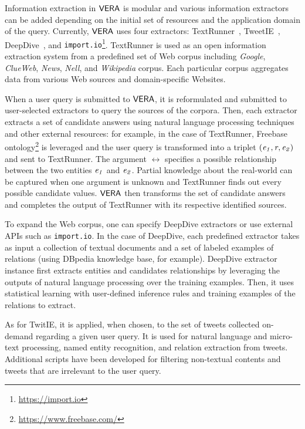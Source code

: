Information extraction in $\mathsf{VERA}$ is modular and  various information extractors can be added depending on the initial set of resources  and the application domain of the query. Currently, $\mathsf{VERA}$ uses four extractors: TextRunner~\cite{Yates07}, TweetIE~\cite{twitie}, DeepDive~\cite{Zha15}, and {\small\texttt{import.io}}\footnote{\scriptsize{\url{https://import.io}}}. TextRunner is  used as an open information extraction system from a predefined set of Web corpus including \emph{Google}, \emph{ClueWeb}, \emph{News}, \emph{Nell}, and 
\emph{Wikipedia} corpus. Each particular corpus aggregates data from various  
 Web sources and domain-specific Websites.

When a user query is submitted to $\mathsf{VERA}$, it is reformulated and submitted to user-selected extractors to query the 
sources of the corpora. Then, each extractor extracts a set of candidate answers using natural language processing techniques and other external resources: for example, in the case of TextRunner, Freebase ontology\footnote{\scriptsize{\url{https://www.freebase.com/}}} is leveraged and the user query is transformed into a triplet $(\mathit{e_{1}}, \mathit{r}_{}, \mathit{e_{2}})$ and sent to TextRunner. The argument $\rel{}$  specifies a possible relationship between the two entities $\mathit{e_{1}}$ and $\mathit{e_{2}}$. 
Partial knowledge about the real-world can be captured when  one  argument is unknown and TextRunner  finds out every possible candidate values.  $\mathsf{VERA}$ then transforms the set of candidate answers and completes the output of TextRunner with its respective identified sources. 


To expand the Web corpus, one can specify DeepDive extractors or use external APIs such as {\small\texttt{import.io}}. In the case of DeepDive, each predefined extractor takes as input a collection of textual documents and a set of labeled examples of relations (using DBpedia knowledge base, for example). DeepDive extractor instance first extracts entities and candidates relationships by leveraging the outputs of natural language processing over the training examples. Then, it uses statistical learning with  user-defined inference rules and training examples of the relations to extract.
 
As for TwitIE, it is applied, when chosen, to the set of tweets collected on-demand regarding a given user query. It is used for natural language and micro-text processing, named entity recognition, and relation extraction from tweets. Additional scripts have been developed for filtering non-textual contents and  tweets that are irrelevant to the user query.

